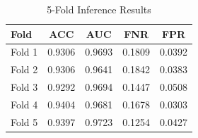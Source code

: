 \documentclass[UTF8,12pt]{article}
\begin{document}
\begin{table}[htbp]
  \centering
  \caption{The prediction performance between our model and competing models.}
  \label{tab:architecture_comparison}
\end{table}
\begin{table}[htbp]
    \centering
    \caption{5-Fold Inference Results}
    \label{tab:5fold_inference}
    \begin{tabular}{lcccc}
        \toprule
        Fold & ACC & AUC & FNR & FPR \\
        \midrule
        Fold 1 & 0.9306 & 0.9693 & 0.1809 & 0.0392 \\
        Fold 2 & 0.9306 & 0.9641 & 0.1842 & 0.0383 \\
        Fold 3 & 0.9292 & 0.9694 & 0.1447 & 0.0508 \\
        Fold 4 & 0.9404 & 0.9681 & 0.1678 & 0.0303 \\
        Fold 5 & 0.9397 & 0.9723 & 0.1254 & 0.0427 \\
        \bottomrule
    \end{tabular}
\end{table}
\end{document}

